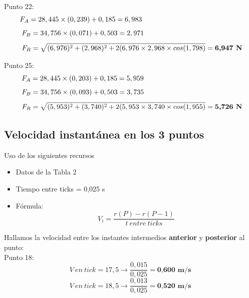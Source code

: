 \documentclass[10pt]{article}
\begin{document}
Punto 22:
 \begin{equation*}
    F_{A} = 28,445 \times (0,239) + 0,185 = 6,983
    \textcolor{Blanco}{-------------..-}
\end{equation*}
\begin{equation*}
    F_{B} = 34,756 \times (0,071) + 0,503 = 2,971
    \textcolor{Blanco}{--------------}
\end{equation*}  
\begin{equation*}
   \textcolor{Blanco}{..} 
    F_{R} = \sqrt{(6,976)^{2} + (2,968)^{2} + 2(6,976 \times 2,968 \times cos(1,798)} = \textbf{6,947 N}
\end{equation*}

Punto 25:
 \begin{equation*}
    F_{A} = 28,445 \times (0,203) + 0,185 = 5,959 \textcolor{Blanco}{--------------}
\end{equation*}
\begin{equation*}
    F_{B} = 34,756 \times (0,093) + 0,503 = 3,735
    \textcolor{Blanco}{--------------}
\end{equation*}  
\begin{equation*}
    \textcolor{Blanco}{..}
    F_{R} = \sqrt{(5,953)^{2} + (3,740)^{2} + 2(5,953 \times 3,740 \times cos(1,955)} = \textbf{5,726 N}
\end{equation*}
\vspace{-3mm}

\subsection{Velocidad instantánea en los 3 puntos}\vspace{2mm}

Uso de los siguientes recursos
\begin{itemize}
    \item Datos de la Tabla 2
    \item Tiempo entre ticks = 0,025 s
    \item Fórmula:
    \large{\begin{equation}
        V_{i} = \frac{r(P) - r(P-1)}{t~entre~ticks}
    \end{equation}}
\end{itemize}

\vspace{0,2cm}
Hallamos la velocidad entre los instantes intermedios \textbf{anterior} y \textbf{posterior} al punto:\\

Punto 18:
 \begin{equation*}
    V~en~tick = 17,5 \longrightarrow \frac{0,015}{0,025} = \textbf{0,600~m/s}
\end{equation*}
\vspace{0,1cm}
 \begin{equation*}
    V~en~tick = 18,5 \longrightarrow \frac{0,013}{0,025} = \textbf{0,520~m/s}
\end{equation*}
\end{document}
